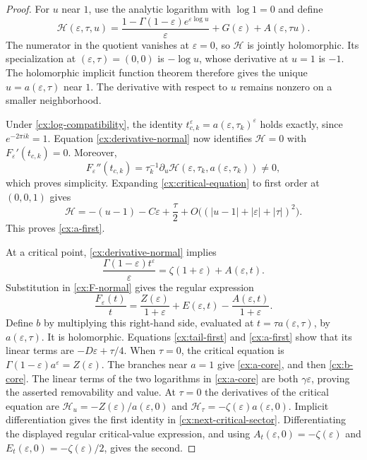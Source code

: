 \documentclass[11pt,a4paper]{article}
\numberwithin{equation}{section}
\theoremstyle{definition}
\theoremstyle{remark}
\begin{document}
\begin{proof}
For $u$ near $1$, use the analytic logarithm with $\log1=0$ and define
\begin{equation}\label{cx:critical-equation}
 \mathcal H(\varepsilon,\tau,u)=
 \frac{1-\Gamma(1-\varepsilon)e^{\varepsilon\log u}}{\varepsilon}
        +G(\varepsilon)+A(\varepsilon,\tau u).
\end{equation}
The numerator in the quotient vanishes at $\varepsilon=0$, so
$\mathcal H$ is jointly holomorphic.  Its specialization at
$(\varepsilon,\tau)=(0,0)$ is $-\log u$, whose derivative at $u=1$ is
$-1$.  The holomorphic implicit function theorem therefore gives the
unique $u=a(\varepsilon,\tau)$ near $1$.  The derivative with respect to
$u$ remains nonzero on a smaller neighborhood.

Under \eqref{cx:log-compatibility}, the identity
$t_{c,k}^{\varepsilon}=a(\varepsilon,\tau_k)^{\varepsilon}$ holds
exactly, since $e^{-2\pi i k}=1$.  Equation
\eqref{cx:derivative-normal} now identifies $\mathcal H=0$ with
$F_\varepsilon'(t_{c,k})=0$.  Moreover,
\[
 F_\varepsilon''(t_{c,k})
  =\tau_k^{-1}\partial_u\mathcal H
      (\varepsilon,\tau_k,a(\varepsilon,\tau_k))\ne0,
\]
which proves simplicity.  Expanding \eqref{cx:critical-equation} to first
order at $(0,0,1)$ gives
\[
 \mathcal H=-(u-1)-C\varepsilon+\frac\tau2
             +O\bigl((|u-1|+|\varepsilon|+|\tau|)^2\bigr).
\]
This proves \eqref{cx:a-first}.

At a critical point, \eqref{cx:derivative-normal} implies
\[
 \frac{\Gamma(1-\varepsilon)t^\varepsilon}{\varepsilon}
          =\zeta(1+\varepsilon)+A(\varepsilon,t).
\]
Substitution in \eqref{cx:F-normal} gives the regular expression
\[
 \frac{F_\varepsilon(t)}t
  =\frac{Z(\varepsilon)}{1+\varepsilon}
       +E(\varepsilon,t)-\frac{A(\varepsilon,t)}{1+\varepsilon}.
\]
Define $b$ by multiplying this right-hand side, evaluated at
$t=\tau a(\varepsilon,\tau)$, by $a(\varepsilon,\tau)$.
It is holomorphic.  Equations \eqref{cx:tail-first} and
\eqref{cx:a-first} show that its linear terms are
$-D\varepsilon+\tau/4$.  When $\tau=0$, the critical equation is
$\Gamma(1-\varepsilon)a^\varepsilon=Z(\varepsilon)$.
The branches near $a=1$ give \eqref{cx:a-core}, and then
\eqref{cx:b-core}.  The linear terms of the two logarithms in
\eqref{cx:a-core} are both $\gamma\varepsilon$, proving the asserted
removability and value.
At $\tau=0$ the derivatives of the critical equation are
$\mathcal H_u=-Z(\varepsilon)/a(\varepsilon,0)$ and
$\mathcal H_\tau=-\zeta(\varepsilon)a(\varepsilon,0)$.
Implicit differentiation gives the first identity in
\eqref{cx:next-critical-sector}.  Differentiating the displayed regular
critical-value expression, and using
$A_t(\varepsilon,0)=-\zeta(\varepsilon)$ and
$E_t(\varepsilon,0)=-\zeta(\varepsilon)/2$, gives the second.
\end{proof}
\end{document}
